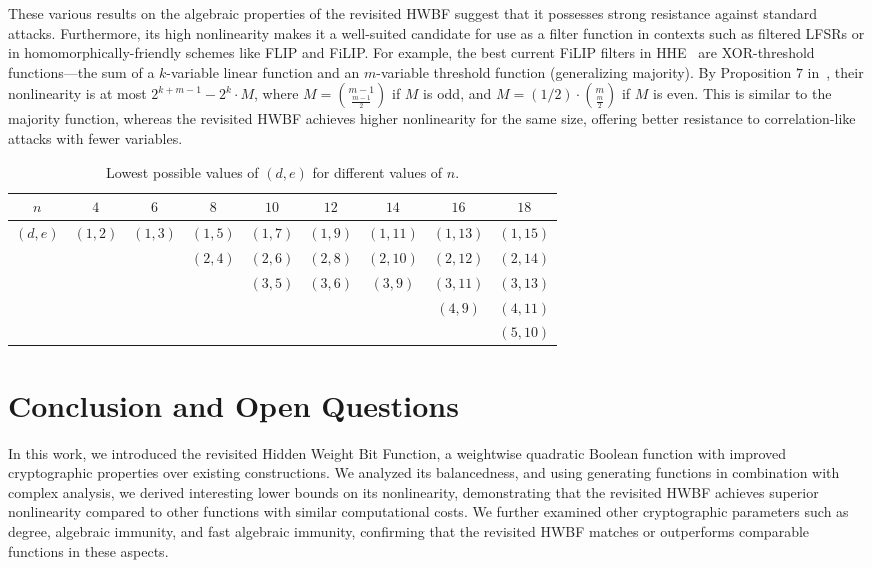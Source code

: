 \documentclass[runningheads,orivec]{llncs}
\newcommand{\hwbf}{\textsf{HWBF}}
\begin{document}
    These various results on the algebraic properties of the revisited \hwbf{} suggest that it possesses strong resistance against standard attacks. Furthermore, its high nonlinearity makes it a well-suited candidate for use as a filter function in contexts such as filtered \textsf{LFSR}s or in homomorphically-friendly schemes like \textsf{FLIP} and \textsf{FiLIP}. For example, the best current \textsf{FiLIP} filters in \textsf{HHE}~\cite{eprint:AGHM24,CCS:CDPP22,CIC:MeaParPei24} are \textsf{XOR}-threshold functions—the sum of a $k$-variable linear function and an $m$-variable threshold function (generalizing majority). By Proposition $7$ in~\cite{IEEE:CarMea21}, their nonlinearity is at most $2^{k+m-1}-2^k\cdot M$, where $M=\binom{m-1}{\frac{m-1}{2}}$ if $M$ is odd, and $M=(1/2)\cdot\binom{m}{\frac{m}{2}}$ if $M$ is even. This is similar to the majority function, whereas the revisited \hwbf{} achieves higher nonlinearity for the same size, offering better resistance to correlation-like attacks with fewer variables.
    \begin{table}
    	\scriptsize
    	\centering
        \caption{Lowest possible values of $(d, e)$ for different values of $n$.}
    	\label{table:FAI}
    	\begin{tabular}{|c|c|c|c|c|c|c|c|c|}
            \hline
            $n$&$4$&$6$&$8$&$10$&$12$&$14$&$16$&$18$\\
            \hline
            $(d,e)$&$(1,2)$&$(1,3)$&$(1,5)$&$(1,7)$&$(1,9)$&$(1,11)$&$(1,13)$&$(1,15)$\\
            &&&$(2,4)$&$(2,6)$&$(2,8)$&$(2,10)$&$(2,12)$&$(2,14)$\\
            &&&&$(3,5)$&$(3,6)$&$(3,9)$&$(3,11)$&$(3,13)$\\
            &&&&&&&$(4,9)$&$(4,11)$\\
            &&&&&&&&$(5,10)$\\
            \hline
    	\end{tabular}
    \end{table}
    
    \section{Conclusion and Open Questions}
    
    In this work, we introduced the revisited Hidden Weight Bit Function, a weightwise quadratic Boolean function with improved cryptographic properties over existing constructions. We analyzed its balancedness, and using generating functions in combination with complex analysis, we derived interesting lower bounds on its nonlinearity, demonstrating that the revisited \hwbf{} achieves superior nonlinearity compared to other functions with similar computational costs. We further examined other cryptographic parameters such as degree, algebraic immunity, and fast algebraic immunity, confirming that the revisited \hwbf{} matches or outperforms comparable functions in these aspects.
    
\end{document}
